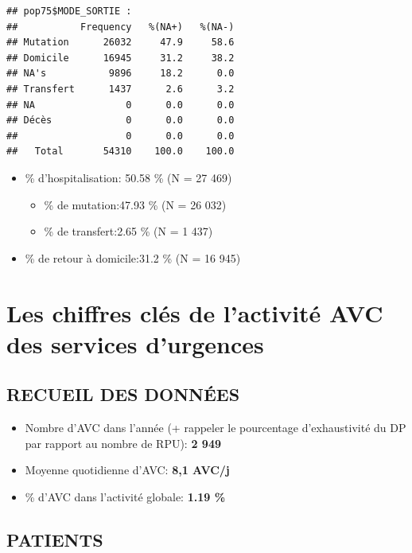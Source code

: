 \documentclass[]{article}
\begin{document}
\begin{verbatim}
## pop75$MODE_SORTIE : 
##           Frequency   %(NA+)   %(NA-)
## Mutation      26032     47.9     58.6
## Domicile      16945     31.2     38.2
## NA's           9896     18.2      0.0
## Transfert      1437      2.6      3.2
## NA                0      0.0      0.0
## Décès             0      0.0      0.0
##                   0      0.0      0.0
##   Total       54310    100.0    100.0
\end{verbatim}

\begin{itemize}
\itemsep1pt\parskip0pt
\item
  \% d'hospitalisation: 50.58 \% (N = 27 469)

  \begin{itemize}
  \itemsep1pt\parskip0pt
  \item
    \% de mutation:47.93 \% (N = 26 032)
  \item
    \% de transfert:2.65 \% (N = 1 437)
  \end{itemize}
\item
  \% de retour à domicile:31.2 \% (N = 16 945)
\end{itemize}

\section{Les chiffres clés de l'activité AVC des services
d'urgences}\label{les-chiffres-cles-de-lactivite-avc-des-services-durgences}

\subsection{RECUEIL DES DONNÉES}\label{recueil-des-donnees-3}

\begin{itemize}
\itemsep1pt\parskip0pt
\item
  Nombre d'AVC dans l'année (+ rappeler le pourcentage d'exhaustivité du
  DP par rapport au nombre de RPU): \textbf{2 949}
\item
  Moyenne quotidienne d'AVC: \textbf{8,1 AVC/j}
\item
  \% d'AVC dans l'activité globale: \textbf{1.19 \%}
\end{itemize}

\subsection{PATIENTS}\label{patients-3}
\end{document}
